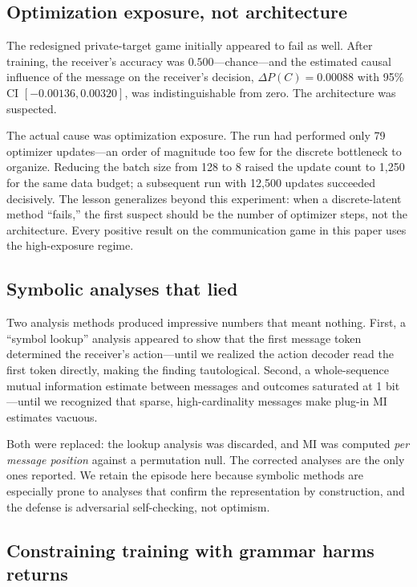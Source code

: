 \documentclass[11pt]{article}
\begin{document}
\subsection{Optimization exposure, not architecture}

The redesigned private-target game initially appeared to fail as well. After training, the receiver's accuracy was $0.500$---chance---and the estimated causal influence of the message on the receiver's decision, $\Delta P(C) = 0.00088$ with 95\% CI $[-0.00136,0.00320]$, was indistinguishable from zero. The architecture was suspected.

The actual cause was optimization exposure. The run had performed only 79 optimizer updates---an order of magnitude too few for the discrete bottleneck to organize. Reducing the batch size from 128 to 8 raised the update count to 1,250 for the same data budget; a subsequent run with 12,500 updates succeeded decisively. The lesson generalizes beyond this experiment: when a discrete-latent method ``fails,'' the first suspect should be the number of optimizer steps, not the architecture. Every positive result on the communication game in this paper uses the high-exposure regime.

\subsection{Symbolic analyses that lied}

Two analysis methods produced impressive numbers that meant nothing. First, a ``symbol lookup'' analysis appeared to show that the first message token determined the receiver's action---until we realized the action decoder read the first token directly, making the finding tautological. Second, a whole-sequence mutual information estimate between messages and outcomes saturated at 1 bit---until we recognized that sparse, high-cardinality messages make plug-in MI estimates vacuous.

Both were replaced: the lookup analysis was discarded, and MI was computed \textit{per message position} against a permutation null. The corrected analyses are the only ones reported. We retain the episode here because symbolic methods are especially prone to analyses that confirm the representation by construction, and the defense is adversarial self-checking, not optimism.

\subsection{Constraining training with grammar harms returns}
\end{document}
